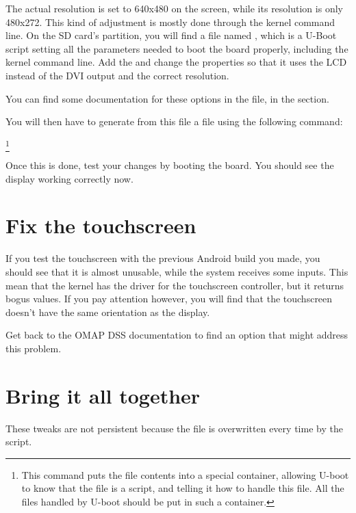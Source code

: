 The actual resolution is set to 640x480 on the screen, while its
resolution is only 480x272. This kind of adjustment is mostly done
through the kernel command line. On the SD card's 
partition, you will find a file named , which is a
U-Boot script setting all the parameters needed to boot the board
properly, including the kernel command line. Add the
 and change the  properties
so that it uses the LCD instead of the DVI output and the correct
resolution.

You can find some documentation for these options in the
 file, in the
 section.

You will then have to generate from this  file a
 file using the following command:

\footnote{This command puts the  file contents into a
  special container, allowing U-boot to know that the 
  file is a script, and telling it how to handle this file. All the
  files handled by U-boot should be put in such a container.}
 
Once this is done, test your changes by booting the board. You should
see the display working correctly now.

\section{Fix the touchscreen}

If you test the touchscreen with the previous Android build you made,
you should see that it is almost unusable, while the system receives
some inputs. This mean that the kernel has the driver for the
touchscreen controller, but it returns bogus values. If you pay
attention however, you will find that the touchscreen doesn't have the
same orientation as the display.

Get back to the OMAP DSS documentation to find an option that might
address this problem.

\section{Bring it all together}

These tweaks are not persistent because the  file is
overwritten every time by the 
script.

